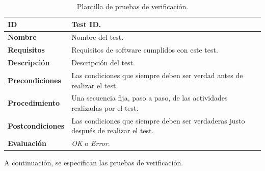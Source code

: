 \begin{center}
\begin{table}[htb]
\centering
\caption{Plantilla de pruebas de verificación.}
\begin{tabular}{@{}p{2.5cm} p{9cm}@{}} 
\toprule
\textbf{ID} 					& Test ID. \\
\midrule
\textbf{Nombre} 				& Nombre del test. \\
\midrule
\textbf{Requisitos} 		& Requisitos de \gls{software} cumplidos con este test. \\
\midrule
\textbf{Descripción} 		& Descripción del test. \\
\midrule
\textbf{Precondiciones}		& Las condiciones que siempre deben ser verdad antes de realizar el test. \\
\midrule
\textbf{Procedimiento}			& Una secuencia fija, paso a paso, de las actividades realizadas por el test. \\
\midrule
\textbf{Postcondiciones} 		& Las condiciones que siempre deben ser verdaderas justo después de realizar el test. \\
\midrule
\textbf{Evaluación} 			& \textit{OK} o \textit{Error}. \\
\bottomrule
\end{tabular}
\label{tab:verification_tests}
\end{table}
\end{center}

A continuación, se especifican las pruebas de verificación.

